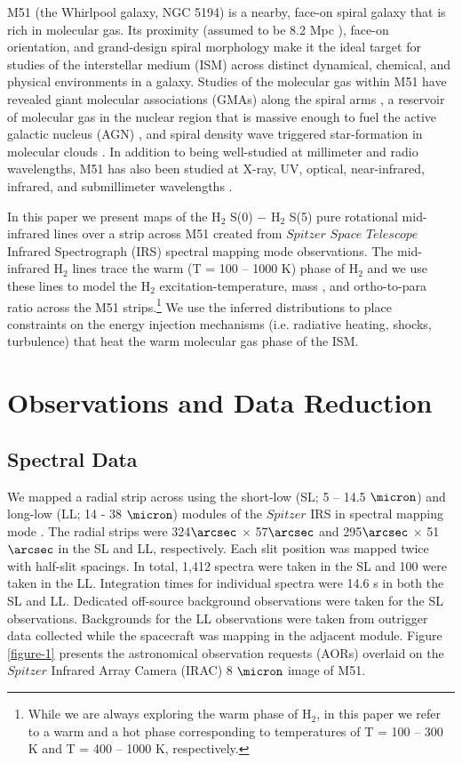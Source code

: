 \documentclass[12pt,preprint]{aastex}
\begin{document}
M51 (the Whirlpool galaxy, NGC 5194) is a nearby,
face-on spiral galaxy that is rich in molecular gas.  Its proximity
(assumed to be 8.2 Mpc \citep{tul88}), face-on orientation, and
grand-design spiral morphology make it the ideal target for
studies of the interstellar medium (ISM) across distinct dynamical,
chemical, and physical environments in a galaxy.  Studies of the
molecular gas within M51 have revealed giant molecular associations
(GMAs) along the spiral arms \citep{vog88,ran90,aal99}, a reservoir 
of molecular gas in the nuclear region that is massive enough 
to fuel the active galactic nucleus (AGN) \citep{sco98}, and spiral density wave 
triggered star-formation in molecular clouds \citep{vog88}.
In addition to being well-studied at millimeter and radio wavelengths,
M51 has also been studied at X-ray, UV, optical, near-infrared,
infrared, and submillimeter wavelengths \citep{pal85, ter98, sco01, cal05, mat04, mei05}.  
  
In this paper we present maps of the  
H$_2$ S(0) $-$ H$_2$ S(5) pure rotational 
mid-infrared lines over a strip across M51 
created from $Spitzer$ $Space$ $Telescope$ 
Infrared Spectrograph (IRS) spectral mapping mode observations.
The mid-infrared H$_2$ lines trace the warm (T = 100 -- 1000 K) phase 
of H$_2$ and we use these lines to model the H$_2$ 
 excitation-temperature, mass \citep{rig02, hig06}, and ortho-to-para ratio 
 \citep{neu98, neu06} across the M51 strips.\footnote{While we 
 are always exploring the warm phase of H$_2$, in this paper 
 we refer to a warm and a hot phase corresponding to 
 temperatures of T = 100 -- 300 K and T = 400 -- 1000 K, 
 respectively.}  We use the inferred distributions to  place constraints 
 on the energy injection mechanisms (i.e. radiative heating, 
 shocks, turbulence) that heat the warm molecular gas 
 phase of the ISM.

\section{Observations and Data Reduction}

\subsection{Spectral Data}

We mapped a radial strip across  using the short-low
(SL; 5 -- 14.5 $\micron$) and long-low (LL; 14 - 38 $\micron$) 
modules of the $Spitzer$ IRS in spectral
mapping mode \citep{hou04}.  The radial strips were 324$\arcsec$ $\times$
57$\arcsec$ and 295$\arcsec$ $\times$ 51$\arcsec$ in the SL and LL,
respectively.  Each slit position was mapped twice with half-slit spacings.  In
total, 1,412 spectra were taken in the SL and 100 were taken in the LL.  
Integration times for individual 
spectra were 14.6 s in both the SL and LL.  Dedicated off-source 
background observations were taken for the SL observations.  Backgrounds for the
LL observations were taken from outrigger data collected while the
spacecraft was mapping in the adjacent module.  Figure \ref{figure-1} 
presents the astronomical observation requests (AORs)
overlaid on the $Spitzer$ Infrared Array Camera (IRAC) 8 $\micron$ image of M51.
\end{document}
